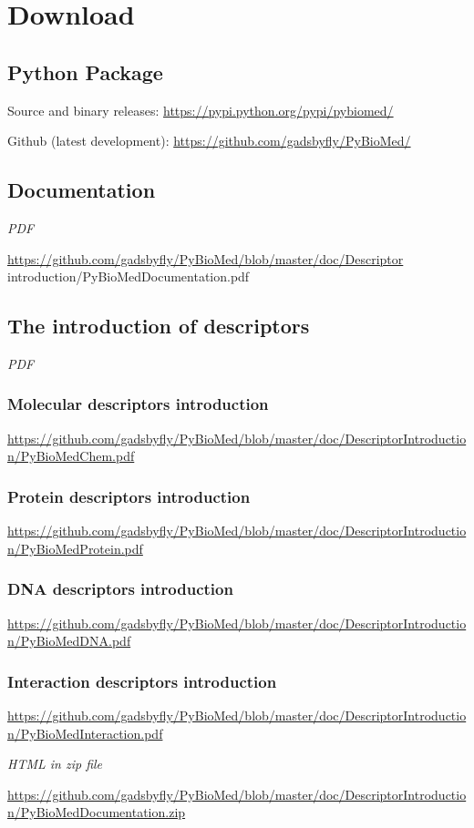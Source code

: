 \documentclass[letterpaper,10pt,english]{sphinxmanual}
\begin{document}
\chapter{Download}
\label{download:download}\label{download::doc}

\section{Python Package}
\label{download:python-package}
Source and binary releases: \url{https://pypi.python.org/pypi/pybiomed/}

Github (latest development): \url{https://github.com/gadsbyfly/PyBioMed/}


\section{Documentation}
\label{download:documentation}
\emph{PDF}

\url{https://github.com/gadsbyfly/PyBioMed/blob/master/doc/Descriptor} introduction/PyBioMedDocumentation.pdf


\section{The introduction of descriptors}
\label{download:the-introduction-of-descriptors}
\emph{PDF}


\subsection{Molecular descriptors introduction}
\label{download:molecular-descriptors-introduction}
\url{https://github.com/gadsbyfly/PyBioMed/blob/master/doc/DescriptorIntroduction/PyBioMedChem.pdf}


\subsection{Protein descriptors introduction}
\label{download:protein-descriptors-introduction}
\url{https://github.com/gadsbyfly/PyBioMed/blob/master/doc/DescriptorIntroduction/PyBioMedProtein.pdf}


\subsection{DNA descriptors introduction}
\label{download:dna-descriptors-introduction}
\url{https://github.com/gadsbyfly/PyBioMed/blob/master/doc/DescriptorIntroduction/PyBioMedDNA.pdf}


\subsection{Interaction descriptors introduction}
\label{download:interaction-descriptors-introduction}
\url{https://github.com/gadsbyfly/PyBioMed/blob/master/doc/DescriptorIntroduction/PyBioMedInteraction.pdf}

\emph{HTML in zip file}

\url{https://github.com/gadsbyfly/PyBioMed/blob/master/doc/DescriptorIntroduction/PyBioMedDocumentation.zip}


\renewcommand{\indexname}{Index}
\printindex
\end{document}
